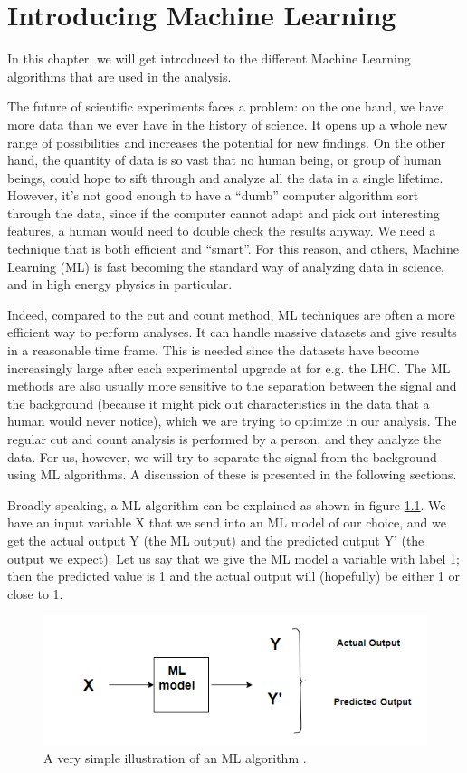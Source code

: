 \chapter{Introducing Machine Learning}
\label{sec:ML}
In this chapter, we will get introduced to the different Machine Learning algorithms that are used in the analysis. 

The future of scientific experiments faces a problem: on the one hand, we have more data than we ever have in the history of science. It opens up a whole new range of possibilities and increases the potential for new findings. On the other hand, the quantity of data is so vast that no human being, or group of human beings, could hope to sift through and analyze all the data in a single lifetime. However, it's not good enough to have a ``dumb'' computer algorithm sort through the data, since if the computer cannot adapt and pick out interesting features, a human would need to double check the results anyway. We need a technique that is both efficient and ``smart''. For this reason, and others, Machine Learning (ML) is fast becoming the standard way of analyzing data in science, and in high energy physics in particular. 

Indeed, compared to the cut and count method, ML techniques are often a more efficient way to perform analyses. It can handle massive datasets and give results in a reasonable time frame. This is needed since the datasets have become increasingly large after each experimental upgrade at for e.g. the LHC. The ML methods are also usually more sensitive to the separation between the signal and the background (because it might pick out characteristics in the data that a human would never notice), which we are trying to optimize in our analysis. The regular cut and count analysis is performed by a person, and they analyze the data. For us, however, we will try to separate the signal from the background using ML algorithms. A discussion of these is presented in the following sections. 

Broadly speaking, a ML algorithm can be explained as shown in figure \ref{fig:MLex}. We have an input variable X that we send into an ML model of our choice, and we get the actual output Y (the ML output) and the predicted output Y' (the output we expect). Let us say that we give the ML model a variable with label 1; then the predicted value is 1 and the actual output will (hopefully) be either 1 or close to 1.   

\begin{figure}[H]
    \centering
    \includegraphics[width = \textwidth]{Figures/FromOnline/MLex.png}
    \caption{A very simple illustration of an ML algorithm \cite{MLex}.}
    \label{fig:MLex}
\end{figure}


